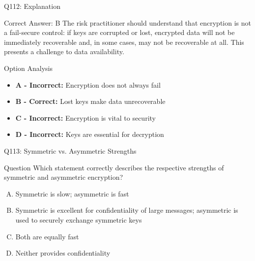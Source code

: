 \documentclass{beamer}
\begin{document}
	\begin{frame}{Q112: Explanation}
		\begin{block}{Correct Answer: B}
			The risk practitioner should understand that encryption is not a fail-secure control: if keys are corrupted or lost, encrypted data will not be immediately recoverable and, in some cases, may not be recoverable at all. This presents a challenge to data availability.
		\end{block}
		\begin{block}{Option Analysis}
			\begin{itemize}
				\item \textbf{A - Incorrect:} Encryption does not always fail
				\item \textbf{B - Correct:} Lost keys make data unrecoverable
				\item \textbf{C - Incorrect:} Encryption is vital to security
				\item \textbf{D - Incorrect:} Keys are essential for decryption
			\end{itemize}
		\end{block}
	\end{frame}
	
	\begin{frame}{Q113: Symmetric vs. Asymmetric Strengths}
		\begin{block}{Question}
			Which statement correctly describes the respective strengths of symmetric and asymmetric encryption?
		\end{block}
		\begin{enumerate}[(A)]
			\item Symmetric is slow; asymmetric is fast
			\item Symmetric is excellent for confidentiality of large messages; asymmetric is used to securely exchange symmetric keys
			\item Both are equally fast
			\item Neither provides confidentiality
		\end{enumerate}
	\end{frame}
	
\end{document}
